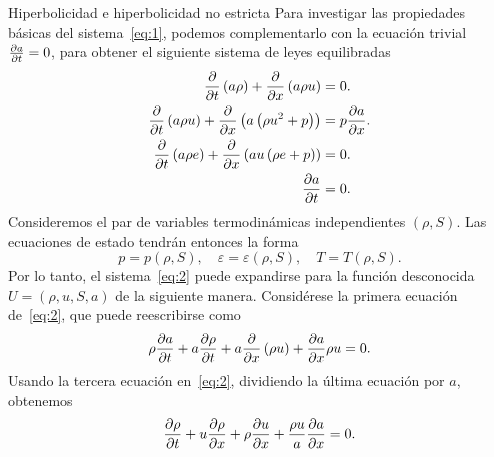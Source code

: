\documentclass[
    8pt,
    aspectratio=1610,
    c,
    intlimits,
		handout,
    leqno,
    professionalfonts,
]{beamer}
\begin{document}
\begin{frame}
	\begin{block}{Hiperbolicidad e hiperbolicidad no estricta}
		Para investigar las propiedades básicas del sistema~\eqref{eq:1},
		podemos complementarlo con la ecuación trivial $\diffp{a}{t}=0$,
		para obtener el siguiente sistema de leyes equilibradas
		\begin{equation}\label{eq:2}
			\begin{aligned}
				\diffp{}{t}
				\left(a\rho\right)+
				\diffp{}{x}
				\left(a\rho u\right)                 & =
				0.                                       \\
				\diffp{}{t}
				\left(a\rho u\right)+
				\diffp{}{x}
				\left(a\left(\rho u^{2}+p\right)\right)
				                                     & =
				p\diffp{a}{x}.                           \\
				\diffp{}{t}
				\left(a\rho e\right)+
				\diffp{}{x}
				\left(au\left(\rho e+p\right)\right) & =
				0.                                       \\
				\diffp{a}{t}                         & =
				0.
			\end{aligned}
		\end{equation}
		Consideremos el par de variables termodinámicas independientes
		$\left(\rho, S\right)$.
		Las ecuaciones de estado tendrán entonces la forma
		\begin{equation*}
			p=
			p\left(\rho,S\right),\quad
			\varepsilon=
			\varepsilon\left(\rho, S\right),\quad
			T=
			T\left(\rho,S\right).
		\end{equation*}
		Por lo tanto, el sistema~\eqref{eq:2} puede expandirse para la
		función desconocida $U=\left(\rho,u,S,a\right)$ de la siguiente
		manera.
		Considérese la primera ecuación de~\eqref{eq:2}, que puede
		reescribirse como
		\begin{equation*}
			\rho\diffp{a}{t}+
			a\diffp{\rho}{t}+
			a\diffp{}{x}\left(\rho u\right)+
			\diffp{a}{x}\rho u=
			0.
		\end{equation*}
		Usando la tercera ecuación en~\eqref{eq:2}, dividiendo la última
		ecuación por $a$, obtenemos
		\begin{equation}\label{eq:3}
			\diffp{\rho}{t}+
			u\diffp{\rho}{x}+
			\rho\diffp{u}{x}+
			\frac{\rho u}{a}\diffp{a}{x}=
			0.
		\end{equation}
	\end{block}
\end{frame}
\end{document}
